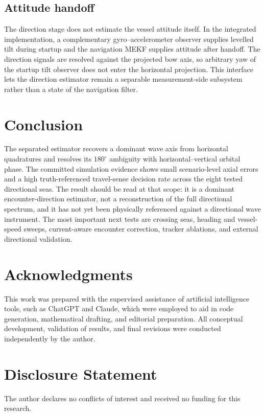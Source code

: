\documentclass[conference]{IEEEtran}
\begin{document}
\subsection{Attitude handoff}
\label{sec:proxy-handoff}
The direction stage does not estimate the vessel attitude itself.  In the
integrated implementation, a complementary gyro--accelerometer observer supplies
levelled tilt during startup and the navigation MEKF supplies attitude after
handoff.  The direction signals are resolved against the projected bow axis,
so arbitrary yaw of the startup tilt observer does not enter the horizontal
projection.  This interface lets the direction estimator remain a separable
measurement-side subsystem rather than a state of the navigation filter.






\section{Conclusion}
The separated estimator recovers a dominant wave axis from horizontal
quadratures and resolves its $180^\circ$ ambiguity with horizontal--vertical
orbital phase.  The committed simulation evidence shows small scenario-level
axial errors and a high truth-referenced travel-sense decision rate across the
eight tested directional seas.  The result should be read at that scope: it is
a dominant encounter-direction estimator, not a reconstruction of the full
directional spectrum, and it has not yet been physically referenced against a
directional wave instrument.  The most important next tests are crossing seas,
heading and vessel-speed sweeps, current-aware encounter correction, tracker
ablations, and external directional validation.

\appendices


\section*{Acknowledgments}
This work was prepared with the supervised assistance of artificial intelligence
tools, such as ChatGPT and Claude, which were employed to aid in
code generation, mathematical drafting, and editorial preparation. All
conceptual development, validation of results, and final revisions were
conducted independently by the author.

\section*{Disclosure Statement}
The author declares no conflicts of interest and received no funding for this
research.



\end{document}
